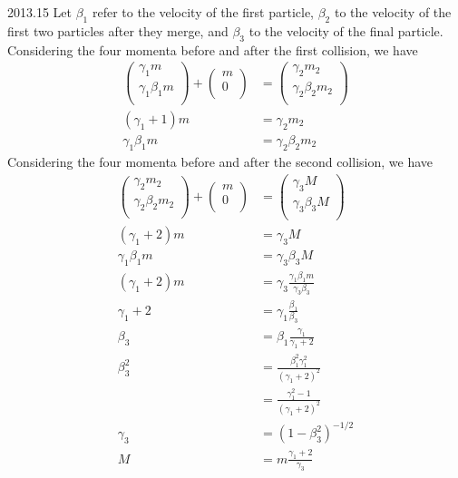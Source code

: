 \documentclass[12pt]{article}
\begin{document}
\begin{solution}{2013.15}
Let $\beta_1$ refer to the velocity of the first particle, $\beta_2$ to the velocity of the first two particles after they merge, and $\beta_3$ to the velocity of the final particle.
Considering the four momenta before and after the first collision, we have
\begin{align*}
\left( \begin{array}{c}
\gamma_1 m \\
\gamma_1 \beta_1 m \\
\end{array} \right) + \left( \begin{array}{c}
m \\
0 \\
\end{array} \right) & = \left( \begin{array}{c}
\gamma_2 m_2 \\
\gamma_2 \beta_2 m_2 \\
\end{array} \right) \\
(\gamma_1 +1) m & = \gamma_2 m_2 \\
\gamma_1 \beta_1 m & = \gamma_2 \beta_2 m_2
\end{align*}
Considering the four momenta before and after the second collision, we have
\begin{align*}
\left( \begin{array}{c}
\gamma_2 m_2 \\
\gamma_2 \beta_2 m_2 \\
\end{array} \right) + \left( \begin{array}{c}
m \\
0 \\
\end{array} \right) & = \left( \begin{array}{c}
\gamma_3 M \\
\gamma_3 \beta_3 M \\
\end{array} \right) \\
(\gamma_1 + 2) m & = \gamma_3 M \\
\gamma_1 \beta_1 m & = \gamma_3 \beta_3 M \\
(\gamma_1 +2) m & = \gamma_3 \frac{\gamma_1 \beta_1 m}{\gamma_3 \beta_3} \\
\gamma_1 + 2 & = \gamma_1 \frac{\beta_1}{\beta_3} \\
\beta_3 & = \beta_1 \frac{\gamma_1}{\gamma_1 + 2} \\
\beta_3^2 & = \frac{\beta_1^2 \gamma_1^2}{(\gamma_1 + 2)^2} \\
& = \frac{\gamma_1^2 - 1}{(\gamma_1 + 2)^2} \\
\gamma_3 & = \left( 1 - \beta_3^2 \right)^{-1/2} \\
M & = m \frac{\gamma_1 + 2}{\gamma_3} \\
\end{align*}


\end{solution}
\end{document}
